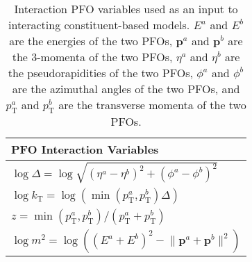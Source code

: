 \begin{table}[!htb]
    \centering
    \caption{Interaction PFO variables used as an input to interacting constituent-based models. $E^a$ and $E^b$ are the energies of the two PFOs, $\textbf{p}^a$ and $\textbf{p}^b$ are the 3-momenta of the two PFOs, $\eta^a$ and $\eta^b$ are the pseudorapidities of the two PFOs, $\phi^a$ and $\phi^b$ are the azimuthal angles of the two PFOs, and $p_\mathrm{T}^a$ and $p_\mathrm{T}^b$ are the transverse momenta of the two PFOs. \cite{part}}
    \label{tab:pfo_interaction_variables}
    \begin{tabular}{l}
    \toprule
        PFO Interaction Variables \\
    \midrule
        $\log \Delta = \log{\sqrt{(\eta^a - \eta^b)^2 + (\phi^a - \phi^b)^2}}$ \\
        $\log k_\mathrm{T} = \log{(\min{(p_\mathrm{T}^a, p_\mathrm{T}^b)} \Delta)}$ \\
        $z = \min{(p_\mathrm{T}^a, p_\mathrm{T}^b)}/(p_\mathrm{T}^a + p_\mathrm{T}^b)$ \\
        $\log m^2 = \log{\left((E^a + E^b)^2 -  \lVert \textbf{p}^a + \textbf{p}^b \rVert^2\right)}$ \\
    \bottomrule
    \end{tabular}
\end{table}
    